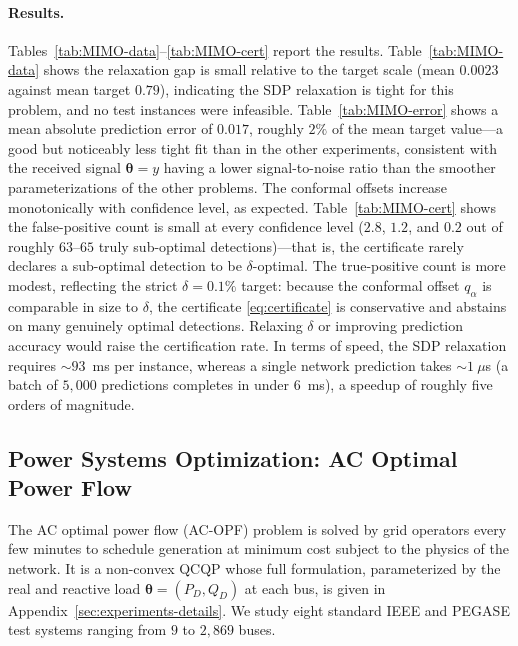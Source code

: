 \documentclass[10pt]{article} %
\theoremstyle{plain}
\theoremstyle{definition}
\theoremstyle{remark}
\begin{document}
\paragraph{Results.} Tables~\ref{tab:MIMO-data}--\ref{tab:MIMO-cert} report the results. Table~\ref{tab:MIMO-data} shows the relaxation gap is small relative to the target scale (mean $0.0023$ against mean target $0.79$), indicating the SDP relaxation is tight for this problem, and no test instances were infeasible. Table~\ref{tab:MIMO-error} shows a mean absolute prediction error of $0.017$, roughly $2\%$ of the mean target value---a good but noticeably less tight fit than in the other experiments, consistent with the received signal $\bm{\theta} = y$ having a lower signal-to-noise ratio than the smoother parameterizations of the other problems. The conformal offsets increase monotonically with confidence level, as expected. Table~\ref{tab:MIMO-cert} shows the false-positive count is small at every confidence level ($2.8$, $1.2$, and $0.2$ out of roughly $63$--$65$ truly sub-optimal detections)---that is, the certificate rarely declares a sub-optimal detection to be $\delta$-optimal. The true-positive count is more modest, reflecting the strict $\delta = 0.1\%$ target: because the conformal offset $q_\alpha$ is comparable in size to $\delta$, the certificate \eqref{eq:certificate} is conservative and abstains on many genuinely optimal detections. Relaxing $\delta$ or improving prediction accuracy would raise the certification rate. In terms of speed, the SDP relaxation requires $\sim\!93$~ms per instance, whereas a single network prediction takes $\sim\!1~\mu$s (a batch of $5{,}000$ predictions completes in under $6$~ms), a speedup of roughly five orders of magnitude.

\subsection{Power Systems Optimization: AC Optimal Power Flow}

The AC optimal power flow (AC-OPF) problem is solved by grid operators every few minutes to schedule generation at minimum cost subject to the physics of the network. It is a non-convex QCQP whose full formulation, parameterized by the real and reactive load $\bm{\theta} = (P_D, Q_D)$ at each bus, is given in Appendix~\ref{sec:experiments-details}. We study eight standard IEEE and PEGASE test systems ranging from $9$ to $2{,}869$ buses.
\end{document}

